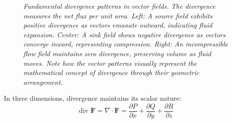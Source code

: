 \begin{figure}[H]
\caption{\textit{Fundamental divergence patterns in vector fields. The divergence measures the net flux per unit area. Left: A source field exhibits positive divergence as vectors emanate outward, indicating fluid expansion. Center: A sink field shows negative divergence as vectors converge inward, representing compression. Right: An incompressible flow field maintains zero divergence, preserving volume as fluid moves. Note how the vector patterns visually represent the mathematical concept of divergence through their geometric arrangement.}}
\label{fig:divergence_patterns}
\end{figure}

\noindent In three dimensions, divergence maintains its scalar nature:
\[
\text{div }\mathbf{F} = \nabla \cdot \mathbf{F} = \frac{\partial P}{\partial x} + \frac{\partial Q}{\partial y} + \frac{\partial R}{\partial z}
\]

